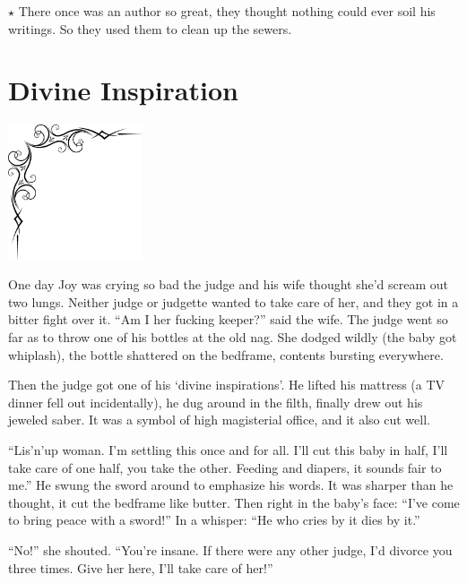 \documentclass[oneside]{book}
\begin{document}

$\star$ There once was an author so great, they thought nothing could ever soil
his writings.  So they used them to clean up the sewers.


\chapter{Divine Inspiration}

\vspace{-2in}
\hspace{-.5in}
\includegraphics[width=150px]{ulcorner1.eps}

One day Joy was crying so bad the judge and his wife thought she'd
scream out two lungs.
Neither judge or judgette wanted to take care of her, and they got in a
bitter fight over it.  ``Am I her fucking keeper?'' said the wife.
The judge went so far as to throw one of his bottles
at the old nag.  She dodged wildly (the baby got whiplash), the bottle shattered
on the bedframe, contents bursting everywhere.

Then the judge got one of his `divine inspirations'.
He lifted his mattress (a TV dinner fell out incidentally), he dug around
in the filth, finally drew out his jeweled saber.
It was a symbol of high magisterial office, and it also cut well.

``Lis'n'up woman.  I'm settling this once and for all.
I'll cut this baby in half, I'll take care of one half, you take
the other.  Feeding and diapers, it sounds fair to me.''  He swung the sword around
to emphasize his words.  It was sharper than he thought, it cut the
bedframe like butter.  Then right in the baby's face:  ``I've come to bring
peace with a sword!''  In a whisper:  ``He who cries by it dies by it.''

``No!'' she shouted.  ``You're insane.  If there were any other judge,
I'd divorce you three times.  Give her here, I'll take care of her!''
\end{document}
